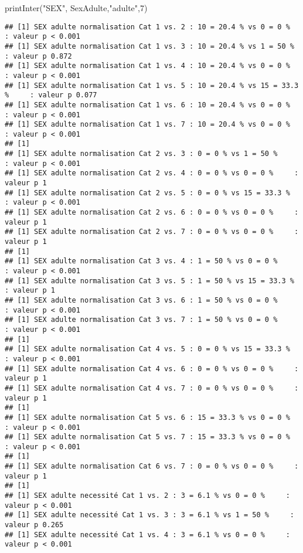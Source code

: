 \documentclass[
]{article}
\newenvironment{Shaded}{\begin{snugshade}}{\end{snugshade}}
\newcommand{\DecValTok}[1]{\textcolor[rgb]{0.00,0.00,0.81}{#1}}
\newcommand{\FunctionTok}[1]{\textcolor[rgb]{0.00,0.00,0.00}{#1}}
\newcommand{\NormalTok}[1]{#1}
\newcommand{\StringTok}[1]{\textcolor[rgb]{0.31,0.60,0.02}{#1}}
\begin{document}
\begin{Shaded}
\begin{Highlighting}[]
\FunctionTok{printInter}\NormalTok{(}\StringTok{"SEX"}\NormalTok{, SexAdulte,}\StringTok{"adulte"}\NormalTok{,}\DecValTok{7}\NormalTok{)}
\end{Highlighting}
\end{Shaded}

\begin{verbatim}
## [1] SEX adulte normalisation Cat 1 vs. 2 : 10 = 20.4 % vs 0 = 0 %     : valeur p < 0.001
## [1] SEX adulte normalisation Cat 1 vs. 3 : 10 = 20.4 % vs 1 = 50 %     : valeur p 0.872
## [1] SEX adulte normalisation Cat 1 vs. 4 : 10 = 20.4 % vs 0 = 0 %     : valeur p < 0.001
## [1] SEX adulte normalisation Cat 1 vs. 5 : 10 = 20.4 % vs 15 = 33.3 %     : valeur p 0.077
## [1] SEX adulte normalisation Cat 1 vs. 6 : 10 = 20.4 % vs 0 = 0 %     : valeur p < 0.001
## [1] SEX adulte normalisation Cat 1 vs. 7 : 10 = 20.4 % vs 0 = 0 %     : valeur p < 0.001
## [1] 
## [1] SEX adulte normalisation Cat 2 vs. 3 : 0 = 0 % vs 1 = 50 %     : valeur p < 0.001
## [1] SEX adulte normalisation Cat 2 vs. 4 : 0 = 0 % vs 0 = 0 %     : valeur p 1
## [1] SEX adulte normalisation Cat 2 vs. 5 : 0 = 0 % vs 15 = 33.3 %     : valeur p < 0.001
## [1] SEX adulte normalisation Cat 2 vs. 6 : 0 = 0 % vs 0 = 0 %     : valeur p 1
## [1] SEX adulte normalisation Cat 2 vs. 7 : 0 = 0 % vs 0 = 0 %     : valeur p 1
## [1] 
## [1] SEX adulte normalisation Cat 3 vs. 4 : 1 = 50 % vs 0 = 0 %     : valeur p < 0.001
## [1] SEX adulte normalisation Cat 3 vs. 5 : 1 = 50 % vs 15 = 33.3 %     : valeur p 1
## [1] SEX adulte normalisation Cat 3 vs. 6 : 1 = 50 % vs 0 = 0 %     : valeur p < 0.001
## [1] SEX adulte normalisation Cat 3 vs. 7 : 1 = 50 % vs 0 = 0 %     : valeur p < 0.001
## [1] 
## [1] SEX adulte normalisation Cat 4 vs. 5 : 0 = 0 % vs 15 = 33.3 %     : valeur p < 0.001
## [1] SEX adulte normalisation Cat 4 vs. 6 : 0 = 0 % vs 0 = 0 %     : valeur p 1
## [1] SEX adulte normalisation Cat 4 vs. 7 : 0 = 0 % vs 0 = 0 %     : valeur p 1
## [1] 
## [1] SEX adulte normalisation Cat 5 vs. 6 : 15 = 33.3 % vs 0 = 0 %     : valeur p < 0.001
## [1] SEX adulte normalisation Cat 5 vs. 7 : 15 = 33.3 % vs 0 = 0 %     : valeur p < 0.001
## [1] 
## [1] SEX adulte normalisation Cat 6 vs. 7 : 0 = 0 % vs 0 = 0 %     : valeur p 1
## [1] 
## [1] SEX adulte necessité Cat 1 vs. 2 : 3 = 6.1 % vs 0 = 0 %     : valeur p < 0.001
## [1] SEX adulte necessité Cat 1 vs. 3 : 3 = 6.1 % vs 1 = 50 %     : valeur p 0.265
## [1] SEX adulte necessité Cat 1 vs. 4 : 3 = 6.1 % vs 0 = 0 %     : valeur p < 0.001

\end{verbatim}
\end{document}
